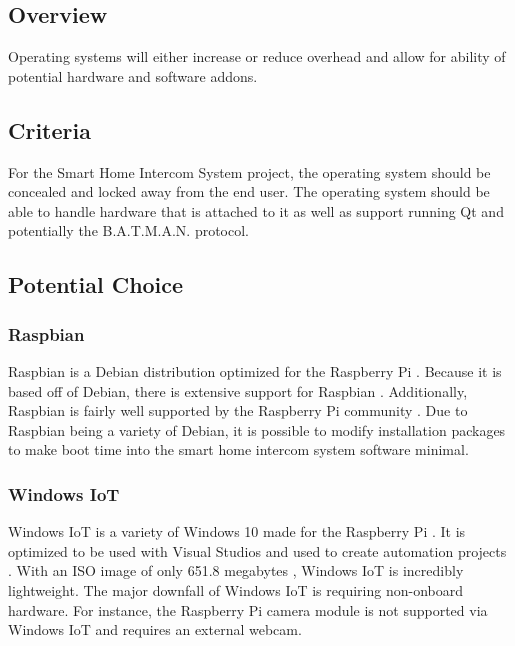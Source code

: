 \documentclass[onecolumn, draftclsnofoot,10pt, compsoc]{IEEEtran}
\begin{document}
\subsection{Overview}

Operating systems will either increase or reduce overhead and allow for ability of potential hardware and software addons.

\subsection{Criteria}

For the Smart Home Intercom System project, the operating system should be concealed and locked away from the end user. The operating system should be able to handle hardware that is attached to it as well as support running Qt and potentially the B.A.T.M.A.N. protocol.

\subsection{Potential Choice}

\subsubsection{Raspbian}

Raspbian is a Debian distribution optimized for the Raspberry Pi \cite{Raspbian:OS}. Because it is based off of Debian, there is extensive support for Raspbian \cite{Raspbian:FAQ}. Additionally, Raspbian is fairly well supported by the Raspberry Pi community \cite{Raspbian:OSlist}. Due to Raspbian being a variety of Debian, it is possible to modify installation packages to make boot time into the smart home intercom system software minimal.

\subsubsection{Windows IoT}

Windows IoT is a variety of Windows 10 made for the Raspberry Pi \cite{Win10:IoT}. It is optimized to be used with Visual Studios and used to create automation projects \cite{Win10:dev}. With an ISO image of only 651.8 megabytes \cite{Win10:IoT}, Windows IoT is incredibly lightweight. The major downfall of Windows IoT is requiring non-onboard hardware. For instance, the Raspberry Pi camera module is not supported via Windows IoT and requires an external webcam.
\end{document}

